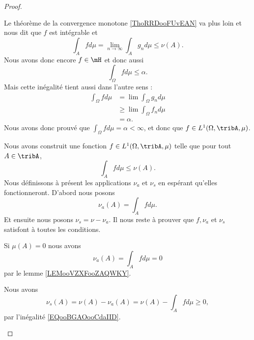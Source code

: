 \begin{proof}
\begin{subproof}
		Le théorème de la convergence monotone \ref{ThoRRDooFUvEAN} va plus loin et nous dit que \( f\) est intégrable et
		\begin{equation}		\label{EQooBGAOooCdaIID}
			\int_Afd\mu=\lim_{n\to\infty }\int_Ag_nd\mu\leq \nu(A).
		\end{equation}
		Nous avons donc encore \( f\in\mH\) et donc aussi
		\begin{equation}
			\int_{\Omega}fd\mu\leq \alpha.
		\end{equation}
		Mais cette inégalité tient aussi dans l'autre sens :
		\begin{subequations}
			\begin{align}
				\int_{\Omega}fd\mu & =\lim\int_{\Omega}g_nd\mu     \\
				                   & \geq \lim\int_{\Omega}f_nd\mu \\
				                   & =\alpha.
			\end{align}
		\end{subequations}
		Nous avons donc prouvé que \( \int_{\Omega}fd\mu=\alpha<\infty\), et donc que \( f\in L^1(\Omega,\tribA,\mu)\).

		Nous avons construit une fonction \( f\in L^1(\Omega,\tribA, \mu)\) telle que pour tout \( A\in\tribA\),
		\begin{equation}
			\int_Afd\mu\leq \nu(A).
		\end{equation}
		Nous définissons à présent les applications \( \nu_a\) et \( \nu_s\) en espérant qu'elles fonctionneront. D'abord nous posons
		\begin{equation}		\label{EQooVKTXooCwZdha}
			\nu_a(A)=\int_Afd\mu.
		\end{equation}
		Et ensuite nous posons \( \nu_s=\nu-\nu_a\). Il nous reste à prouver que \( f, \nu_a\) et \( \nu_s\) satisfont à toutes les conditions.
		\spitem[\( \nu_a\ll \mu\)]

		Si \( \mu(A)=0\) nous avons
		\begin{equation}
			\nu_a(A)=\int_Afd\mu=0
		\end{equation}
		par le lemme \ref{LEMooVZXFooZAQWKY}.


		Nous avons
		\begin{equation}
			\nu_s(A)=\nu(A)-\nu_a(A)=\nu(A)-\int_Afd\mu\geq 0,
		\end{equation}
		par l'inégalité \eqref{EQooBGAOooCdaIID}.


\end{subproof}
\end{proof}
